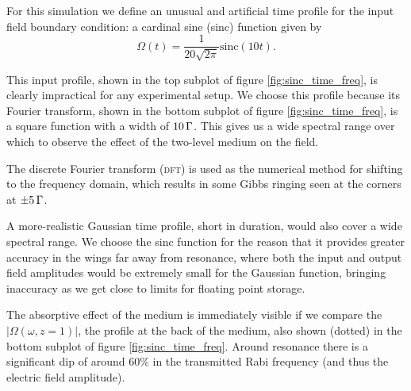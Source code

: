     For this simulation we define an unusual and artificial time profile for the input field boundary condition: a cardinal sine (sinc) function given by
    \begin{equation}\label{eqn:sinc}
      \Omega(t) = \frac{1}{20 \sqrt{2 \pi}} \mathrm{sinc}(10 t).
    \end{equation}

    This input profile, shown in the top subplot of figure
    \ref{fig:sinc_time_freq}, is clearly impractical for any experimental setup.
    We choose this profile because its Fourier transform, shown in the bottom
    subplot of figure \ref{fig:sinc_time_freq}, is a square function with a
    width of $\unit[10]{\Gamma}$. This gives us a wide spectral range over which to observe the effect of the two-level medium on the field.

    The discrete Fourier transform (\textsc{dft}) is used as the numerical
    method for shifting to the frequency domain, which results in some Gibbs
    ringing\cite{Hewitt1979} seen at the corners at $\unit[\pm 5]{\Gamma}$.

    A more-realistic Gaussian time profile, short in duration, would also cover
    a wide spectral range. We choose the sinc function for the reason that it
    provides greater accuracy in the wings far away from resonance, where both
    the input and output field amplitudes would be extremely small for the
    Gaussian function, bringing inaccuracy as we get close to limits for
    floating point storage.

    The absorptive effect of the medium is immediately visible if we compare the
    $\lvert \Omega(\omega, z\!=\!1) \rvert$, the profile at the back of the
    medium, also shown (dotted) in the bottom subplot of figure
    \ref{fig:sinc_time_freq}. Around resonance there is a significant dip of
    around $60\%$ in the transmitted Rabi frequency (and thus the electric field
    amplitude).

